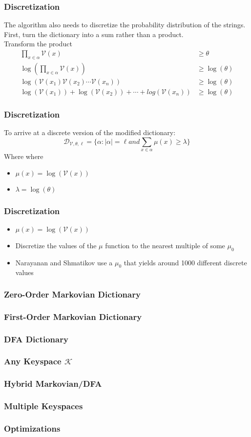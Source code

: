 \documentclass{beamer}
\newenvironment{where}{\noindent{}where\begin{itemize}}{\end{itemize}}
\begin{document}
\begin{frame}
\frametitle{Discretization}
The algorithm also needs to discretize the probability distribution of the strings. First, turn the dictionary into a sum rather than a product. \\
Transform the product
\begin{align*}
\prod_{x \in \alpha}\mathcal{V}(x) & \geq \theta \\
\log(\prod_{x \in \alpha}\mathcal{V}(x)) & \geq \log(\theta) \\
\log(\mathcal{V}(x_1)\mathcal{V}(x_2)\dotsb \mathcal{V}(x_n)) & \geq \log(\theta) \\
\log(\mathcal{V}(x_1)) + \log(\mathcal{V}(x_2)) + \dotsb + log(\mathcal{V}(x_n)) & \geq \log(\theta)
\end{align*}
\end{frame}

\begin{frame}
\frametitle{Discretization}
To arrive at a discrete version of the modified dictionary:
\begin{equation*}
\mathcal{D}_{\mathcal{V},\theta,\ell} = \lbrace \alpha :  \lvert \alpha \rvert = \ell and \sum_{x \in \alpha}\mu(x) \geq \lambda \rbrace
\end{equation*}
Where
\begin{where}
\item $\mu(x) = \log(\mathcal{V}(x))$
\item $\lambda = \log(\theta)$ 
\end{where}
\end{frame}

\begin{frame}
\frametitle{Discretization}
\begin{itemize}
\item $\mu(x) = \log(\mathcal{V}(x))$
\item Discretize the values of the $\mu$ function to the nearest multiple of some $\mu_0$
\item Narayanan and Shmatikov use a $\mu_0$ that yields around 1000 different discrete values
\end{itemize}
\end{frame}

\begin{frame}
\frametitle{Zero-Order Markovian Dictionary}
\end{frame}
\begin{frame}
\frametitle{First-Order Markovian Dictionary}
\end{frame}
\begin{frame}
\frametitle{DFA Dictionary}
\end{frame}
\begin{frame}
\frametitle{Any Keyspace $\mathcal{K}$}
\end{frame}
\begin{frame}
\frametitle{Hybrid Markovian/DFA}
\end{frame}
\begin{frame}
\frametitle{Multiple Keyspaces}
\end{frame}
\begin{frame}
\frametitle{Optimizations}
\end{frame}
\end{document}
